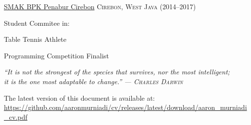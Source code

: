 \documentclass[11pt,a4paper]{article} %
\begin{document}
\headedsection %
{\href{}{SMAK BPK Penabur Cirebon}}
{\dotfill\textsc{Cirebon, West Java (2014--2017)}} {

    \headedsubsection %
    { Student Commitee in: }
    {}
    {}

    \headedsubsection %
    { Table Tennis Athlete}
    {~}
    {}

    \headedsubsection %
    { Programming Competition Finalist}
    {~}
    {}
}

\vfill

\begin{flushright}
    \textit{
        ``It is not the strongest of the species that survives, nor the most intelligent;\\it is the one most adaptable to change.'' — \textsc{Charles Darwin}}
\end{flushright}

\vfill

\vfill

{
\footnotesize\noindent
    The latest version of this document is available at:\\\href{https://github.com/aaronmurniadi/cv/releases/latest/download/aaron_murniadi_cv.pdf}{https://github.com/aaronmurniadi/cv/releases/latest/download/aaron_murniadi_cv.pdf
}
}
\end{document}
